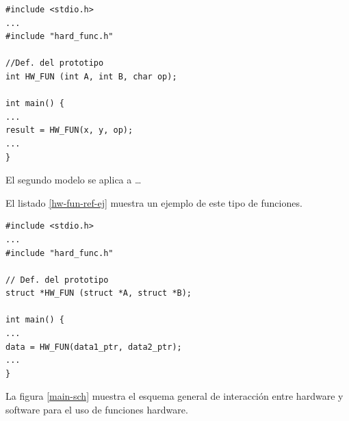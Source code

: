 \begin{center}
\begin{minipage}{10cm}
\lstset{%
	numbers=left, %
	numberstyle=\tiny, %
	stepnumber=1, %
	numbersep=10pt, %
	language=C,%
	basicstyle=\footnotesize
}
\begin{lstlisting}[caption={[Ejemplo de operación 1]Ejemplo de operación para el modelo de ejecución de una función hardware con paso de argumentos por valor.}, label=hw-fun-val-ej]
#include <stdio.h>
...
#include "hard_func.h"

//Def. del prototipo
int HW_FUN (int A, int B, char op); 

int main() {
...
result = HW_FUN(x, y, op);
...
}
\end{lstlisting}
\end{minipage}
\end{center}

El segundo modelo se aplica a \ldots

El listado \ref{hw-fun-ref-ej} muestra un ejemplo de este tipo de funciones.

\begin{center}
\begin{minipage}{10cm}
\lstset{%
	numbers=left, %
	numberstyle=\tiny, %
	stepnumber=1, %
	numbersep=10pt, %
	language=C,%
	basicstyle=\footnotesize
}
\begin{lstlisting}[label=hw-fun-ref-ej, caption={[Ejemplo de operación 2]Ejemplo de operación para el modelo de ejecución de una función hardware con paso de argumentos por referencia.}]
#include <stdio.h>
...
#include "hard_func.h"

// Def. del prototipo
struct *HW_FUN (struct *A, struct *B); 

int main() {
...
data = HW_FUN(data1_ptr, data2_ptr);
...
}
\end{lstlisting}
\end{minipage}
\end{center}

La figura \ref{main-sch} muestra el esquema general de interacción entre hardware y software para el uso de funciones hardware.

